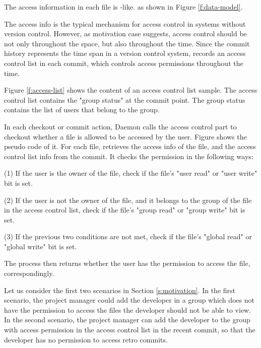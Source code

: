 The access information in each file is \unix-like.
as shown in Figure \ref{f:data-model}.
\iffalse
Figure 3-a \hw{TODO draw the graph} shows a sample of the access permission
information of several files in a directory. Figure 3-b\hw{TODO draw the graph}
shows how the access
permission information is stored in the backend \git database.
\fi

The access info is the typical mechanism for access control in systems
without version control. However, as motivation case  suggests, access control should be not only
throughout the space, but also throughout the time. Since the
commit history represents the time span in a version control system, \sys
records an access control list in each commit, which controls access permissions
throughout the time.



Figure \ref{f:access-list} shows the content of an access control
list sample. The access control list contains the "group status" at the commit
point. The group status contains the list of users that belong to the group.

In each checkout or commit action, \Sys Daemon calls the access control part to
checkout whether a file is allowed to be accessed by the user. Figure
 shows the pseudo code of it.
For each file, \sys retrieves the access info of the file, and the access
control list info from the commit. It checks the permission in the following
ways:

(1) If the user is the owner of the file, check if the file's "user read" or
"user write" bit is set.

(2) If the user is not the owner of the file, and it belongs to the group of the
file in the access control list, check if the file's "group read" or "group
write" bit is set.

(3) If the previous two conditions are not met, check if the file's "global
read" or "global write" bit is set.

The process then returns whether the user has the permission to access the file,
correspondingly.

Let us consider the first two scenarios in Section \ref{s:motivation}.
In the first scenario, the project manager could add the developer in a group
which does not have the permission to access the files the developer should not
be able to view. In the second scenario, the project manager can add the
developer to the group with access permission in the access control list in the
recent commit, so that the developer has no permission to access retro commits.

